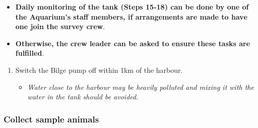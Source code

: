 \documentclass[
  12pt,
]{report}
\providecommand{\tightlist}{%
  \setlength{\itemsep}{0pt}\setlength{\parskip}{0pt}}\usepackage{longtable,booktabs,array}
\begin{document}
\begin{itemize}
\tightlist
\item
  \textbf{Daily monitoring of the tank (Steps 15-18) can be done by one
  of the Aquarium's staff members, if arrangements are made to have one
  join the survey crew}.
\item
  \textbf{Otherwise, the crew leader can be asked to ensure these tasks
  are fulfilled}.
\end{itemize}

\begin{enumerate}
\def\labelenumi{\arabic{enumi}.}
\setcounter{enumi}{18}
\tightlist
\item
  Switch the Bilge pump off within 1km of the harbour.

  \begin{itemize}
  \tightlist
  \item
    \emph{Water close to the harbour may be heavily polluted and mixing
    it with the water in the tank should be avoided}.
  \end{itemize}
\end{enumerate}

\hypertarget{collect-sample-animals}{%
\subsubsection{Collect sample animals}\label{collect-sample-animals}}
\end{document}
